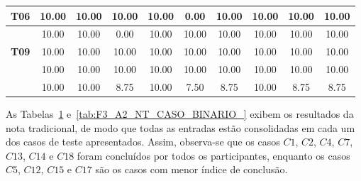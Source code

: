 \begin{table}[htbp]
\begin{tabular}{c|ccccccccc|}
		\multicolumn{1}{|c|}{\textbf{T06}} & \multicolumn{1}{c|}{10.00} & \multicolumn{1}{c|}{10.00} & \multicolumn{1}{c|}{10.00} & \multicolumn{1}{c|}{10.00} & \multicolumn{1}{c|}{0.00} & \multicolumn{1}{c|}{10.00} & \multicolumn{1}{c|}{10.00} & \multicolumn{1}{c|}{10.00} & 10.00 \\ \hline
		\rowcolor[HTML]{F2F2F2} 
		\multicolumn{1}{|c|}{\cellcolor[HTML]{F2F2F2}\textbf{T08}} & \multicolumn{1}{c|}{\cellcolor[HTML]{F2F2F2}10.00} & \multicolumn{1}{c|}{\cellcolor[HTML]{F2F2F2}10.00} & \multicolumn{1}{c|}{\cellcolor[HTML]{F2F2F2}0.00} & \multicolumn{1}{c|}{\cellcolor[HTML]{F2F2F2}10.00} & \multicolumn{1}{c|}{\cellcolor[HTML]{F2F2F2}10.00} & \multicolumn{1}{c|}{\cellcolor[HTML]{F2F2F2}10.00} & \multicolumn{1}{c|}{\cellcolor[HTML]{F2F2F2}10.00} & \multicolumn{1}{c|}{\cellcolor[HTML]{F2F2F2}10.00} & 10.00 \\ \hline
		\multicolumn{1}{|c|}{\textbf{T09}} & \multicolumn{1}{c|}{10.00} & \multicolumn{1}{c|}{10.00} & \multicolumn{1}{c|}{10.00} & \multicolumn{1}{c|}{10.00} & \multicolumn{1}{c|}{10.00} & \multicolumn{1}{c|}{10.00} & \multicolumn{1}{c|}{10.00} & \multicolumn{1}{c|}{10.00} & 10.00 \\ \hline
		\rowcolor[HTML]{F2F2F2} 
		\multicolumn{1}{|c|}{\cellcolor[HTML]{F2F2F2}\textbf{T10}} & \multicolumn{1}{c|}{\cellcolor[HTML]{F2F2F2}10.00} & \multicolumn{1}{c|}{\cellcolor[HTML]{F2F2F2}10.00} & \multicolumn{1}{c|}{\cellcolor[HTML]{F2F2F2}10.00} & \multicolumn{1}{c|}{\cellcolor[HTML]{F2F2F2}10.00} & \multicolumn{1}{c|}{\cellcolor[HTML]{F2F2F2}10.00} & \multicolumn{1}{c|}{\cellcolor[HTML]{F2F2F2}10.00} & \multicolumn{1}{c|}{\cellcolor[HTML]{F2F2F2}10.00} & \multicolumn{1}{c|}{\cellcolor[HTML]{F2F2F2}10.00} & 10.00 \\ \hline
		\rowcolor[HTML]{D0CECE} 
		\multicolumn{1}{|c|}{\cellcolor[HTML]{D0CECE}\textbf{Média}} & \multicolumn{1}{c|}{\cellcolor[HTML]{D0CECE}10.00} & \multicolumn{1}{c|}{\cellcolor[HTML]{D0CECE}10.00} & \multicolumn{1}{c|}{\cellcolor[HTML]{D0CECE}8.75} & \multicolumn{1}{c|}{\cellcolor[HTML]{D0CECE}10.00} & \multicolumn{1}{c|}{\cellcolor[HTML]{D0CECE}7.50} & \multicolumn{1}{c|}{\cellcolor[HTML]{D0CECE}8.75} & \multicolumn{1}{c|}{\cellcolor[HTML]{D0CECE}10.00} & \multicolumn{1}{c|}{\cellcolor[HTML]{D0CECE}8.75} & 8.75 \\ \hline
	\end{tabular}
	\label{tab:F3_A2_NT_CASO_BINARIO}
\end{table}

As Tabelas~\ref{tab:F3_A2_NT_CASO_BINARIO} e~\ref{tab:F3_A2_NT_CASO_BINARIO_} exibem os resultados da nota tradicional, de modo que todas as entradas estão consolidadas em cada um dos casos de teste apresentados. Assim, observa-se que os casos $C1$, $C2$, $C4$, $C7$, $C13$, $C14$ e $C18$ foram concluídos por todos os participantes, enquanto os casos $C5$, $C12$, $C15$ e $C17$ são os casos com menor índice de conclusão.

